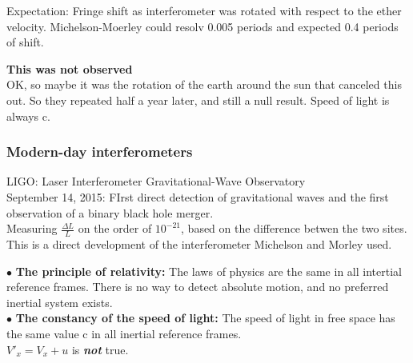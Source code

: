 \documentclass[class=article,crop=false]{standalone}
\begin{document}
Expectation: Fringe shift as interferometer was rotated with respect to the ether velocity. Michelson-Moerley could resolv 0.005 periods and expected 0.4 periods of shift. 

\textbf{This was not observed} \\

OK, so maybe it was the rotation of the earth around the sun that canceled this out. So they repeated half a year later, and still a null result. Speed of light is always c.

\subsubsection{Modern-day interferometers}
LIGO: Laser Interferometer Gravitational-Wave Observatory \\
September 14, 2015: FIrst direct detection of gravitational waves and the first observation of a binary black hole merger. \\
Measuring $\frac{\Delta L}{L}$ on the order of $10^{-21}$, based on the difference betwen the two sites. \\
This is a direct development of the interferometer Michelson and Morley used.

\begin{result}
	$ \bullet $ \textbf{The principle of relativity:} The laws of physics are the same in all intertial reference frames. There is no way to detect absolute motion, and no preferred inertial system exists. \\
	$ \bullet $ \textbf{The constancy of the speed of light:} The speed of light in free space has the same value c in all inertial reference frames. \\
	$ V'_x = V_x + u $ is \emph{\textbf{not}} true.
\end{result}
\end{document}
